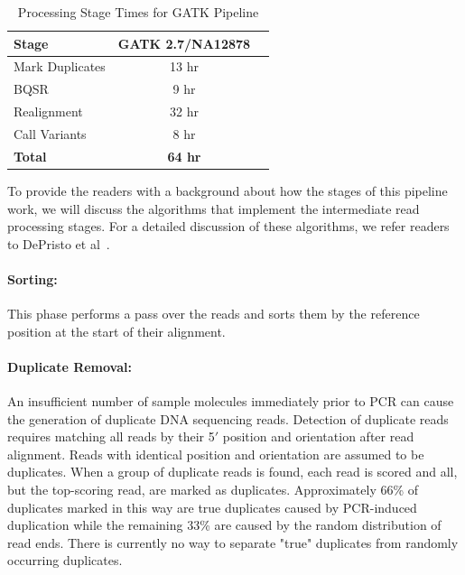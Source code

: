\documentclass[10pt,twocolumn]{article}
\theoremstyle{plain}
\begin{document}
\begin{table}[h]
\caption{Processing Stage Times for GATK Pipeline}
\label{tab:stage-time}
\begin{center}
\begin{tabular}{| l | c | c |}
\hline
\bf Stage & \bf GATK 2.7/NA12878 \\
\hline
Mark Duplicates & 13 hr \\
BQSR & 9 hr \\
Realignment & 32 hr \\
Call Variants & 8 hr \\
\bf Total & \bf 64 hr \\
\hline
\end{tabular}
\end{center}
\end{table}

To provide the readers with a background about how the stages of this pipeline work, we will discuss the algorithms that
implement the intermediate read processing stages. For a detailed discussion of these algorithms, we refer readers to DePristo
et al~\cite{depristo11}.

\paragraph{Sorting:}
\label{sec:sorting}

This phase performs a pass over the reads and sorts them by the reference position at the start of their alignment.

\paragraph{Duplicate Removal:} 
\label{sec:duplicate-removal}

An insufficient number of sample molecules immediately prior to PCR can cause the generation of duplicate DNA sequencing reads.
Detection of duplicate reads requires matching all reads by their 5$'$ position and orientation after read alignment. Reads with
identical position and orientation are assumed to be duplicates. When a group of duplicate reads is found, each read is scored
and all, but the top-scoring read, are marked as duplicates. Approximately 66\% of duplicates marked in this way are true
duplicates caused by PCR-induced duplication while the remaining 33\% are caused by the random distribution of read ends\cite{20565776}.
There is currently no way to separate "true" duplicates from randomly occurring duplicates.
\end{document}
